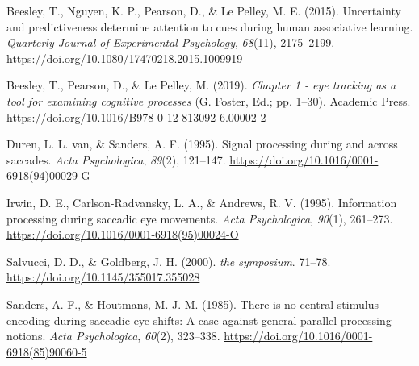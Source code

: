\documentclass[
  man,
  floatsintext,
  longtable,
  nolmodern,
  notxfonts,
  notimes,
  colorlinks=true,linkcolor=blue,citecolor=blue,urlcolor=blue]{apa7}
\newlength{\cslhangindent}
\newenvironment{CSLReferences}[2] %
 {\begin{list}{}{%
  \setlength{\itemindent}{0pt}
  \setlength{\leftmargin}{0pt}
  \setlength{\parsep}{0pt}
  \ifodd #1
   \setlength{\leftmargin}{\cslhangindent}
   \setlength{\itemindent}{-1\cslhangindent}
  \fi
  \setlength{\itemsep}{#2\baselineskip}}}
 {\end{list}}
\begin{document}
\label{refs}
\begin{CSLReferences}{1}{0}
Beesley, T., Nguyen, K. P., Pearson, D., \& Le Pelley, M. E. (2015).
Uncertainty and predictiveness determine attention to cues during human
associative learning. \emph{Quarterly Journal of Experimental
Psychology}, \emph{68}(11), 2175--2199.
\url{https://doi.org/10.1080/17470218.2015.1009919}

Beesley, T., Pearson, D., \& Le Pelley, M. (2019). \emph{Chapter 1 - eye
tracking as a tool for examining cognitive processes} (G. Foster, Ed.;
pp. 1--30). Academic Press.
\url{https://doi.org/10.1016/B978-0-12-813092-6.00002-2}

Duren, L. L. van, \& Sanders, A. F. (1995). Signal processing during and
across saccades. \emph{Acta Psychologica}, \emph{89}(2), 121--147.
\url{https://doi.org/10.1016/0001-6918(94)00029-G}

Irwin, D. E., Carlson-Radvansky, L. A., \& Andrews, R. V. (1995).
Information processing during saccadic eye movements. \emph{Acta
Psychologica}, \emph{90}(1), 261--273.
\url{https://doi.org/10.1016/0001-6918(95)00024-O}

Salvucci, D. D., \& Goldberg, J. H. (2000). \emph{the symposium}.
71--78. \url{https://doi.org/10.1145/355017.355028}

Sanders, A. F., \& Houtmans, M. J. M. (1985). There is no central
stimulus encoding during saccadic eye shifts: A case against general
parallel processing notions. \emph{Acta Psychologica}, \emph{60}(2),
323--338. \url{https://doi.org/10.1016/0001-6918(85)90060-5}

\end{CSLReferences}
\end{document}
